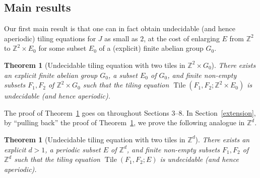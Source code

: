 \documentclass[reqno,a4paper,12pt]{amsart}
\numberwithin{equation}{section}
\numberwithin{figure}{section}
\def\Z{\mathbb{Z}}
\newcommand{\Tile}{\operatorname{Tile}}
\theoremstyle{plain}
\newtheorem{theorem}[thm]{Theorem}
\theoremstyle{definition}
\newcommand{\thmref}[1]{Theorem~\ref{#1}}
\newcommand{\secref}[1]{Section~\ref{#1}}
\begin{document}
\begin{table}[ht]
\caption{Selected constructions of aperiodic or undecidable tiling equations. This list is primarily adapted from \cite{jr}, and incorporates from that reference some corrections to the values of $J$ in several lines of this table.  Constructions labeled (W) arise from a Wang tile construction.  The constructions marked ``aperiodic [undecidable]'' give aperiodic tilings for the specified value of $J$, and an undecidable tiling for an unspecified value of $J$.  The asterisk for our results in Theorems \ref{main}, \ref{main'} denotes the fact that we are replacing $\Z^2$ by $\Z^2 \times E_0$ for some subset $E_0$ of an explicit finite abelian group $G_0$, or by a periodic subset of some high-dimensional lattice $\Z^d$.  The double asterisk indicates that the tiling is nonabelian.  For some other notable constructions of aperiodic or undecidable tiling equations (but with values of $J$ that are either not explicitly stated, or larger than other contemporary constructions), see \cite{jr}, \cite{goodman}, \cite{jv}.}
\label{J-table}
\end{table}%

\subsection{Main results}

Our first main result is that one can in fact obtain undecidable (and hence aperiodic) tiling equations for $J$ as small as $2$, at the cost of enlarging $E$ from $\Z^2$ to $\Z^2 \times E_0$ for some subset $E_0$ of a (explicit) finite abelian group $G_0$.

\begin{theorem}[Undecidable tiling equation with two tiles in $\Z^2\times G_0$]\label{main}  There exists an explicit finite abelian group $G_0$, a subset $E_0$ of $G_0$, and finite non-empty subsets $F_1,F_2$ of $\Z^2 \times G_0$ such that the tiling equation $\Tile(F_1,F_2; \Z^2 \times E_0)$ is undecidable (and hence aperiodic).
\end{theorem}

The proof of \thmref{main} goes on throughout Sections 3--8. In \secref{extension}, by ``pulling back'' the proof of \thmref{main}, we prove the following analogue  in $\Z^d$.

\begin{theorem}[Undecidable tiling equation with two tiles in $\Z^d$]\label{main'}  There exists an explicit $d>1$, a periodic subset $E$ of $\Z^d$, and finite non-empty subsets $F_1,F_2$ of $\Z^d$ such that the tiling equation $\Tile(F_1,F_2; E)$ is undecidable (and hence aperiodic).
\end{theorem}
\end{document}
